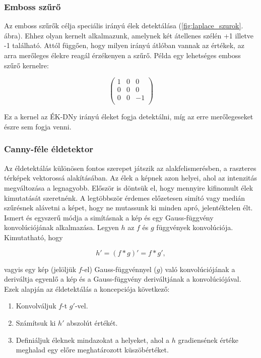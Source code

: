\documentclass[a4paper,12pt]{article}
\begin{document}
\subsubsection{Emboss szűrő}

Az emboss szűrők célja speciális irányú élek detektálása 
(\ref{fig:laplace_szurok}. ábra). Ehhez olyan kernelt alkalmazunk, amelynek két
átellenes szélén +1 illetve -1 található. Attól függően, hogy milyen irányú
átlóban vannak az értékek, az arra merőleges élekre reagál érzékenyen a szűrő.
Példa egy lehetséges emboss szűrő kernelre: 

\begin{displaymath}
\left(
\begin{array}{ccc}
1  & 0 & 0\\
0  & 0 & 0 \\
0  & 0 & -1 \\
\end{array}
\right)
\end{displaymath}

Ez a kernel az ÉK-DNy irányú éleket fogja detektálni, míg az erre merőlegeseket
észre sem fogja venni.

\subsubsection{Canny-féle éldetektor}

Az éldetektálás különösen fontos szerepet játszik az alakfelismerésben, a
raszteres térképek vektorossá alakításában. Az élek a képnek azon helyei, ahol
az intenzitás megváltozása a legnagyobb. Először is döntsük el, hogy mennyire
kifinomult élek kimutatását szeretnénk. A legtöbbször érdemes előzetesen simító
vagy medián szűrésnek alávetni a képet, hogy ne mutassunk ki minden apró,
jelentéktelen élt. Ismert és egyszerű módja a simításnak a kép és egy
Gauss-függvény konvolúciójának alkalmazása.
Legyen $h$ az  $f$ és $g$ függvények konvolúciója. Kimutatható, hogy  

$$h' = (f * g)' = f * g',$$

vagyis egy kép (jelöljük $f$-el)  Gauss-függvénnyel ($g$)
való konvolúciójának a deriváltja 
egyenlő a kép és a Gauss-függvény deriváltjának a konvolúciójával. 
Ezek alapján az éldetektálás a koncepciója következő: 

\begin{enumerate}
	\item Konvolváljuk $f$-t $g'$-vel.
	\item Számítsuk ki $h'$ abszolút értékét.
	\item Definiáljuk éleknek mindazokat a helyeket, ahol a $h$ gradiensének értéke
	meghalad egy előre meghatározott küszöbértéket.
\end{enumerate}
\end{document}
